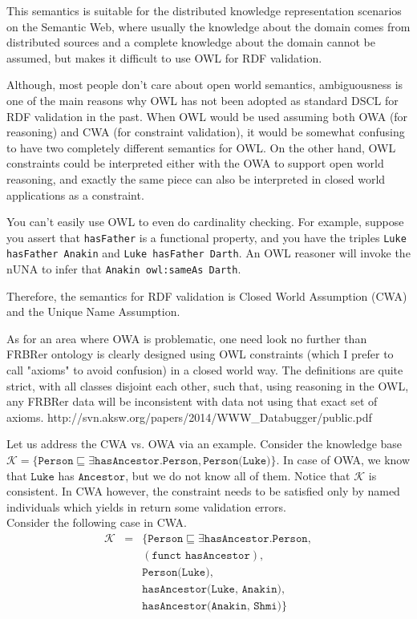 \documentclass{llncs}
\newcommand{\ms}[1]{\texttt{#1}}
\newcommand{\tb}[1]{\todo[size=\small, color=green!40]{\textbf{Thomas:} #1}}
\begin{document}
This semantics is suitable for the distributed knowledge representation scenarios on the Semantic Web, 
where usually the knowledge about the domain comes from distributed
sources and a complete knowledge about the domain cannot be assumed, 
but makes it difficult to use OWL for RDF validation.

Although, most people don’t care about open world semantics, 
ambiguousness is one of the main reasons why OWL has not been adopted as standard DSCL for RDF validation in the past. 
When OWL would be used assuming both OWA (for reasoning) and CWA (for constraint validation),
it would be somewhat confusing to have two completely different semantics for OWL.
On the other hand, OWL constraints could be interpreted either with the OWA to support open
world reasoning, and exactly the same piece can also be interpreted in closed world
applications as a constraint. 

You can't easily use OWL to even do cardinality checking. 
For example, suppose you assert that \ms{hasFather} is a functional property, and you have the triples \ms{Luke hasFather Anakin} and \ms{Luke hasFather Darth}.
An OWL reasoner will invoke the nUNA to infer that \ms{Anakin owl:sameAs Darth}.

Therefore, the semantics for RDF validation is Closed World Assumption (CWA) and the Unique Name Assumption.
 
As for an area where OWA is problematic, one need look no further than
FRBRer ontology is clearly designed using OWL constraints
(which I prefer to call "axioms" to avoid confusion) in a closed world
way. The definitions are quite strict, with all classes disjoint each
other, such that, using reasoning in the OWL, any FRBRer data will be
inconsistent with data not using that exact set of axioms. 
http://svn.aksw.org/papers/2014/WWW\_Databugger/public.pdf


Let us address the CWA vs. OWA via an example. Consider the knowledge base  $\mathcal{K} = \{\ms{Person} \sqsubseteq \exists \ms{hasAncestor.Person}, \ms{Person(Luke)}\}$. In case of OWA, we know that $\ms{Luke}$ has $\ms{Ancestor}$, but we do not know all of them. Notice that $\mathcal{K}$ is consistent. In CWA however, the constraint needs to be satisfied only by named individuals which yields in return some validation errors.\\
Consider the following case in CWA. 
\begin{eqnarray*}
\mathcal{K} &=  & \{\ms{Person} \sqsubseteq \exists \ms{hasAncestor.Person}, \\
 &&(\ms{funct }  \ms{hasAncestor}),\\  && \ms{Person(Luke)},\\ && \ms{hasAncestor(Luke, Anakin)},\\  && \ms{hasAncestor(Anakin, Shmi)}\}
\end{eqnarray*}
\end{document}
